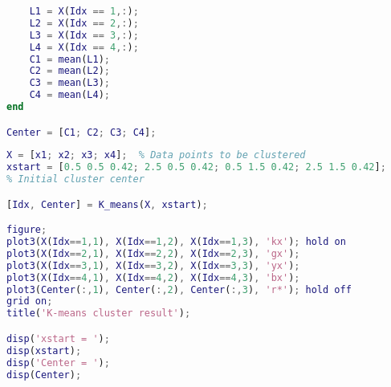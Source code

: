 \documentclass[12pt]{article}  %
\begin{document}
\begin{subappendices}
\begin{lstlisting}[language=MATLAB, name={K_means.m}]
    % Update the central location of the class
    L1 = X(Idx == 1,:);     
    L2 = X(Idx == 2,:);     
    L3 = X(Idx == 3,:);    
    L4 = X(Idx == 4,:);     
    C1 = mean(L1);      
    C2 = mean(L2);      
    C3 = mean(L3);      
    C4 = mean(L4);    
end

Center = [C1; C2; C3; C4];
\end{lstlisting}

\begin{lstlisting}[language=MATLAB, name={Test_K_means.m}]
%% K-means cluster
X = [x1; x2; x3; x4];  % Data points to be clustered
xstart = [0.5 0.5 0.42; 2.5 0.5 0.42; 0.5 1.5 0.42; 2.5 1.5 0.42];  
% Initial cluster center

[Idx, Center] = K_means(X, xstart);

figure;
plot3(X(Idx==1,1), X(Idx==1,2), X(Idx==1,3), 'kx'); hold on
plot3(X(Idx==2,1), X(Idx==2,2), X(Idx==2,3), 'gx');
plot3(X(Idx==3,1), X(Idx==3,2), X(Idx==3,3), 'yx');
plot3(X(Idx==4,1), X(Idx==4,2), X(Idx==4,3), 'bx');
plot3(Center(:,1), Center(:,2), Center(:,3), 'r*'); hold off
grid on;
title('K-means cluster result');

disp('xstart = ');
disp(xstart);
disp('Center = ');
disp(Center);
\end{lstlisting}


\end{subappendices}
\end{document}
